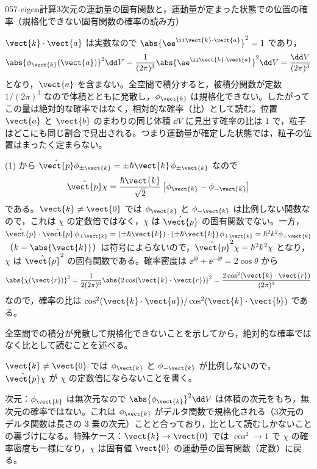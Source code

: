 \documentclass[uplatex,dvipdfmx,a4paper,11pt]{jsarticle}
\begin{document}
\begin{mondai}{057-eigen}{計算}{3次元の運動量の固有関数と，運動量が定まった状態での位置の確率（規格化できない固有関数の確率の読み方）}
\begin{tadashii}
 $\vect{k}\cdot\vect{a}$ は実数なので $\abs{\ee^{\ii\vect{k}\cdot\vect{a}}}^{2}=1$ であり，
\[ \abs{\phi_{\vect{k}}(\vect{a})}^{2}\dd V=\frac{1}{(2\pi)^{3}}\abs{\ee^{\ii\vect{k}\cdot\vect{a}}}^{2}\dd V=\frac{\dd V}{(2\pi)^{3}} \]
となり，$\vect{a}$ を含まない。全空間で積分すると，被積分関数が定数 $1/(2\pi)^{3}$ なので体積とともに発散し，$\phi_{\vect{k}}$ は規格化できない。したがってこの量は絶対的な確率ではなく，相対的な確率（比）として読む。位置 $\vect{a}$ と $\vect{b}$ のまわりの同じ体積 $\dd V$ に見出す確率の比は $1$ で，粒子はどこにも同じ割合で見出される。つまり運動量が確定した状態では，粒子の位置はまったく定まらない。

 (1) から $\hat{\vect{p}}\phi_{\pm\vect{k}}=\pm\hbar\vect{k}\,\phi_{\pm\vect{k}}$ なので
\[ \hat{\vect{p}}\chi=\frac{\hbar\vect{k}}{\sqrt{2}}\left[\phi_{\vect{k}}-\phi_{-\vect{k}}\right] \]
である。$\vect{k}\neq\vect{0}$ では $\phi_{\vect{k}}$ と $\phi_{-\vect{k}}$ は比例しない関数なので，これは $\chi$ の定数倍ではなく，$\chi$ は $\hat{\vect{p}}$ の固有関数でない。一方，$\hat{\vect{p}}\cdot\hat{\vect{p}}\,\phi_{\pm\vect{k}}=(\pm\hbar\vect{k})\cdot(\pm\hbar\vect{k})\,\phi_{\pm\vect{k}}=\hbar^{2}k^{2}\phi_{\pm\vect{k}}$（$k=\abs{\vect{k}}$）は符号によらないので，$\hat{\vect{p}}^{2}\chi=\hbar^{2}k^{2}\chi$ となり，$\chi$ は $\hat{\vect{p}}^{2}$ の固有関数である。確率密度は $\ee^{\ii\theta}+\ee^{-\ii\theta}=2\cos\theta$ から
\[ \abs{\chi(\vect{r})}^{2}=\frac{1}{2(2\pi)^{3}}\abs{2\cos(\vect{k}\cdot\vect{r})}^{2}=\frac{2\cos^{2}(\vect{k}\cdot\vect{r})}{(2\pi)^{3}} \]
なので，確率の比は $\cos^{2}(\vect{k}\cdot\vect{a})/\cos^{2}(\vect{k}\cdot\vect{b})$ である。
\begin{ronten}
  \item {} 全空間での積分が発散して規格化できないことを示してから，絶対的な確率ではなく比として読むことを述べる。
  \item {} $\vect{k}\neq\vect{0}$ では $\phi_{\vect{k}}$ と $\phi_{-\vect{k}}$ が比例しないので，$\hat{\vect{p}}\chi$ が $\chi$ の定数倍にならないことを書く。
\end{ronten}
\kenzan 次元：$\phi_{\vect{k}}$ は無次元なので $\abs{\phi_{\vect{k}}}^{2}\dd V$ は体積の次元をもち，無次元の確率ではない。これは $\phi_{\vect{k}}$ がデルタ関数で規格化される（3次元のデルタ関数は長さの $3$ 乗の次元）ことと合っており，比として読むしかないことの裏づけになる。特殊ケース：$\vect{k}\to\vect{0}$ では $\cos^{2}\to1$ で $\chi$ の確率密度も一様になり，$\chi$ は固有値 $\vect{0}$ の運動量の固有関数（定数）に戻る。

\end{tadashii}
\end{mondai}
\end{document}
